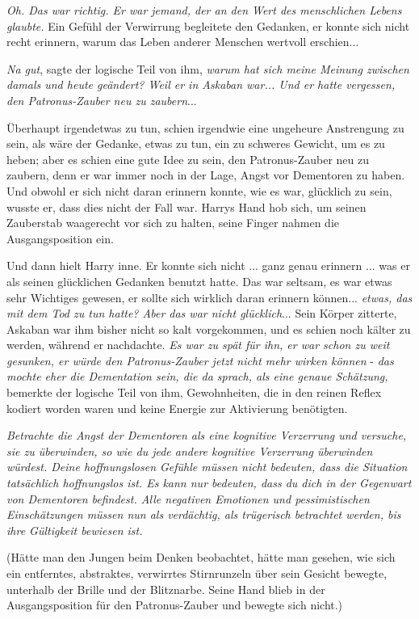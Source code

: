 \emph{Oh. Das war richtig. Er war jemand, der an den Wert des menschlichen
Lebens glaubte.} Ein Gefühl der Verwirrung begleitete den Gedanken, er konnte
sich nicht recht erinnern, warum das Leben anderer Menschen wertvoll erschien...

\emph{Na gut}, sagte der logische Teil von ihm, \emph{warum hat sich meine
Meinung zwischen damals und heute geändert? Weil er in Askaban war... Und er
hatte vergessen, den Patronus-Zauber neu zu zaubern}...

Überhaupt irgendetwas zu tun, schien irgendwie eine ungeheure Anstrengung zu
sein, als wäre der Gedanke, etwas zu tun, ein zu schweres Gewicht, um es zu
heben; aber es schien eine gute Idee zu sein, den Patronus-Zauber neu zu
zaubern, denn er war immer noch in der Lage, Angst vor Dementoren zu haben. Und
obwohl er sich nicht daran erinnern konnte, wie es war, glücklich zu sein,
wusste er, dass dies nicht der Fall war. Harrys Hand hob sich, um seinen
Zauberstab waagerecht vor sich zu halten, seine Finger nahmen die
Ausgangsposition ein.

Und dann hielt Harry inne. Er konnte sich nicht ... ganz genau erinnern ... was
er als seinen glücklichen Gedanken benutzt hatte. Das war seltsam, es war etwas
sehr Wichtiges gewesen, er sollte sich wirklich daran erinnern können...
\emph{etwas, das mit dem Tod zu tun hatte? Aber das war nicht glücklich}... Sein
Körper zitterte, Askaban war ihm bisher nicht so kalt vorgekommen, und es schien
noch kälter zu werden, während er nachdachte. \emph{Es war zu spät für ihn, er
war schon zu weit gesunken, er würde den Patronus-Zauber jetzt nicht mehr wirken
können} - \emph{das mochte eher die Dementation sein, die da sprach, als eine
genaue Schätzung, }bemerkte der logische Teil von ihm, Gewohnheiten, die in den
reinen Reflex kodiert worden waren und keine Energie zur Aktivierung benötigten.

\emph{Betrachte die Angst der Dementoren als eine kognitive Verzerrung und
versuche, sie zu überwinden, so wie du jede andere kognitive Verzerrung
überwinden würdest. Deine hoffnungslosen Gefühle müssen nicht bedeuten, dass die
Situation tatsächlich hoffnungslos ist. Es kann nur bedeuten, dass du dich in
der Gegenwart von Dementoren befindest. Alle negativen Emotionen und
pessimistischen Einschätzungen müssen nun als verdächtig, als trügerisch
betrachtet werden, bis ihre Gültigkeit bewiesen ist.}

(Hätte man den Jungen beim Denken beobachtet, hätte man gesehen, wie sich ein
entferntes, abstraktes, verwirrtes Stirnrunzeln über sein Gesicht bewegte,
unterhalb der Brille und der Blitznarbe. Seine Hand blieb in der
Ausgangsposition für den Patronus-Zauber und bewegte sich nicht.)

